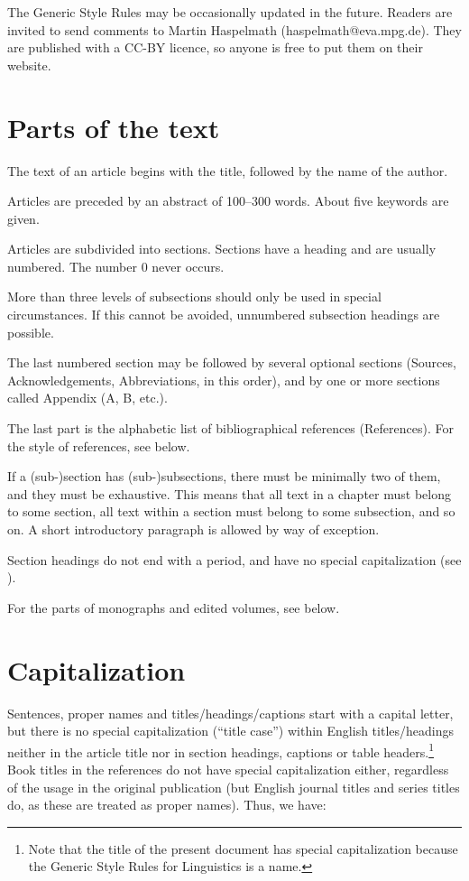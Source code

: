 \documentclass[a4paper]{article}
\newcommand{\gsrex}[1]{{\color{blue}#1}}
\begin{document}
The Generic Style Rules may be occasionally updated in the
future. Readers are invited to send comments to Martin Haspelmath
(haspelmath@eva.mpg.de). They are published with a CC-BY licence, so
anyone is free to put them on their website.

\section{Parts of the text}\label{sec:parts}

The text of an article begins with the title, followed by the name of
the author. 

Articles are preceded by an abstract of 100--300 words. About five keywords are given. 

Articles are subdivided into sections.
Sections have a heading and are usually numbered. The number 0 never
occurs. 

More than three levels of subsections should only be used in
special circumstances. If this cannot be avoided, unnumbered subsection
headings are possible. 

The last numbered section may be followed by
several optional sections (\gsrex{Sources},
\gsrex{Acknowledgements},
\gsrex{Abbreviations},
in this order), and by one or more sections called \gsrex{Appendix} (A, B, etc.).


The last part is the alphabetic list of bibliographical references
(\gsrex{References}). For the style of references, see  below. 

If a
(sub-)section has (sub-)subsections, there must be minimally two of
them, and they must be exhaustive. This means that all text in a chapter
must belong to some section, all text within a section must belong to
some subsection, and so on. A short introductory paragraph is allowed by
way of exception. 

Section headings do not end with a period, and have no
special capitalization (see ). 

For the parts of monographs and edited
volumes, see  below.

\section{Capitalization}\label{sec:capitalization}

Sentences, proper names and titles/headings/captions start with a
capital letter, but there is no special capitalization (``title case'')
within English titles/headings neither in the article title nor in
section headings, captions or table headers.\footnote{Note that the title
of the present document has special capitalization because the Generic
Style Rules for Linguistics is a name.} Book titles in the references
do not have special capitalization either, regardless of the usage in
the original publication (but English journal titles and series titles
do, as these are treated as proper names). Thus, we have:
\end{document}
